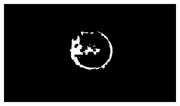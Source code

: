 \documentclass{article}
\begin{document}
\begin{figure}[H]
\begin{subfigure}{.37\textwidth}
  \centering
  \includegraphics[width=0.97\linewidth]{_Figures/raw_data_1_erosion.png}
  \caption{}
  \label{fig:raw_1_erosion}
\end{subfigure}


\end{figure}
\end{document}
